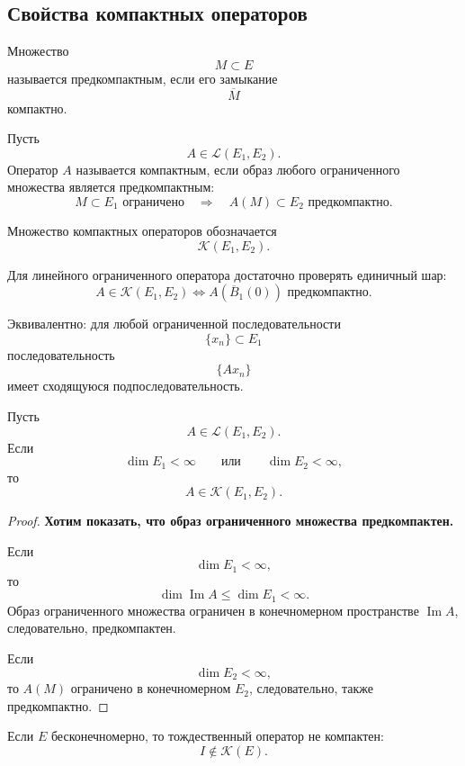 \subsection{Свойства компактных операторов}

\begin{definition}
	Множество
	\[
	M\subset E
	\]
	называется предкомпактным, если его замыкание
	\[
	\overline M
	\]
	компактно.
\end{definition}

\begin{definition}
	Пусть
	\[
	A\in\mathcal L(E_1,E_2).
	\]
	Оператор \(A\) называется компактным, если образ любого ограниченного
	множества является предкомпактным:
	\[
	M\subset E_1 \text{ ограничено}
	\quad\Longrightarrow\quad
	A(M)\subset E_2 \text{ предкомпактно}.
	\]
	
	Множество компактных операторов обозначается
	\[
	\mathcal K(E_1,E_2).
	\]
\end{definition}

\begin{remark}
	Для линейного ограниченного оператора достаточно проверять единичный шар:
	\[
	A\in\mathcal K(E_1,E_2)
	\iff
	A(\overline B_1(0))
	\text{ предкомпактно}.
	\]
	
	Эквивалентно:
	для любой ограниченной последовательности
	\[
	\{x_n\}\subset E_1
	\]
	последовательность
	\[
	\{Ax_n\}
	\]
	имеет сходящуюся подпоследовательность.
\end{remark}

\begin{theorem}
	Пусть
	\[
	A\in\mathcal L(E_1,E_2).
	\]
	Если
	\[
	\dim E_1<\infty
	\qquad\text{или}\qquad
	\dim E_2<\infty,
	\]
	то
	\[
	A\in\mathcal K(E_1,E_2).
	\]
\end{theorem}

\begin{proof}
	\textbf{Хотим показать, что образ ограниченного множества предкомпактен.}
	
	Если
	\[
	\dim E_1<\infty,
	\]
	то
	\[
	\dim\operatorname{Im}A\leq\dim E_1<\infty.
	\]
	Образ ограниченного множества ограничен в конечномерном пространстве
	\(\operatorname{Im}A\), следовательно, предкомпактен.
	
	Если
	\[
	\dim E_2<\infty,
	\]
	то \(A(M)\) ограничено в конечномерном \(E_2\), следовательно,
	также предкомпактно.
\end{proof}

\begin{theorem}
	Если \(E\) бесконечномерно, то тождественный оператор не компактен:
	\[
	I\notin\mathcal K(E).
	\]
\end{theorem}

